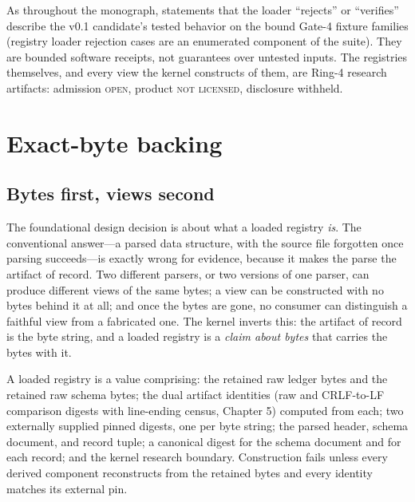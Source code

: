 \begin{boundary}\label{ch06:bd:scope}
As throughout the monograph, statements that the loader ``rejects'' or
``verifies'' describe the v0.1 candidate's tested behavior on the bound
Gate-4 fixture families (registry loader rejection cases are an enumerated
component of the suite). They are bounded software receipts, not
guarantees over untested inputs. The registries themselves, and every view
the kernel constructs of them, are Ring-4 research artifacts: admission
\textsc{open}, product \textsc{not licensed}, disclosure withheld.
\end{boundary}

\section{Exact-byte backing}\label{ch06:bytebacked}

\subsection{Bytes first, views second}

The foundational design decision is about what a loaded registry \emph{is}.
The conventional answer---a parsed data structure, with the source file
forgotten once parsing succeeds---is exactly wrong for evidence, because
it makes the parse the artifact of record. Two different parsers, or two
versions of one parser, can produce different views of the same bytes;
a view can be constructed with no bytes behind it at all; and once the
bytes are gone, no consumer can distinguish a faithful view from a
fabricated one. The kernel inverts this: the artifact of record is the
byte string, and a loaded registry is a \emph{claim about bytes} that
carries the bytes with it.

\begin{definition}\label{ch06:def:bytebacked}
A loaded registry is a value comprising: the retained raw ledger bytes and
the retained raw schema bytes; the dual artifact identities (raw and
CRLF-to-LF comparison digests with line-ending census,
Chapter 5) computed from each; two externally supplied pinned digests, one
per byte string; the parsed header, schema document, and record tuple; a
canonical digest for the schema document and for each record; and the
kernel research boundary. Construction fails unless every derived
component reconstructs from the retained bytes and every identity matches
its external pin.
\end{definition}

